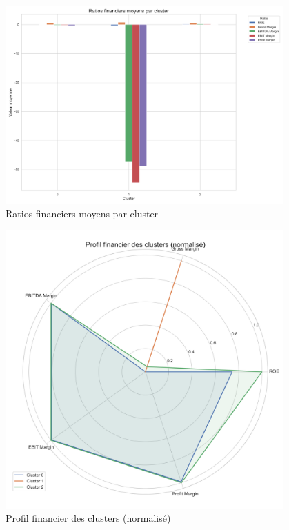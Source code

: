 \documentclass[11pt]{report}
\begin{document}
\begin{figure}[H]
    \centering
    \includegraphics[width=0.95\textwidth]{figures/financial_ratios_by_cluster.png}
    \caption{Ratios financiers moyens par cluster}
    \label{fig:ratios_by_cluster}
\end{figure}

\begin{figure}[H]
    \centering
    \includegraphics[width=0.95\textwidth]{figures/cluster_radar_chart.png}
    \caption{Profil financier des clusters (normalisé)}
    \label{fig:cluster_radar}
\end{figure}
\end{document}
